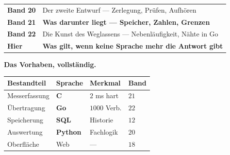 \begin{merksatz}
\begin{center}
\renewcommand{\arraystretch}{1.5}
\begin{tabular}{@{}P{2.6cm}P{6.2cm}@{}}
\toprule
\textbf{Band 20} & Der zweite Entwurf --- Zerlegung, Prüfen, Aufhören\\
\textbf{Band 21} & \textbf{Was darunter liegt --- Speicher, Zahlen, Grenzen}\\
\textbf{Band 22} & Die Kunst des Weglassens --- Nebenläufigkeit, Nähte in Go\\
\midrule
\textbf{Hier} & \textbf{Was gilt, wenn keine Sprache mehr die Antwort gibt}\\
\bottomrule
\end{tabular}
\end{center}

\begin{center}
\begin{minipage}{0.88\textwidth}
\end{minipage}
\end{center}

\textbf{Das Vorhaben, vollständig.}

\begin{center}
{\small
\renewcommand{\arraystretch}{1.45}
\begin{tabular}{@{}P{2.6cm}P{2.2cm}P{2.2cm}P{1.8cm}@{}}
\toprule
\textbf{Bestandteil} & \textbf{Sprache} & \textbf{Merkmal} & \textbf{Band}\\
\midrule
Messerfassung & \textbf{C} & $2$ ms hart & $21$\\
Übertragung & \textbf{Go} & $1000$ Verb. & $22$\\
Speicherung & \textbf{SQL} & Historie & $12$\\
Auswertung & \textbf{Python} & Fachlogik & $20$\\
Oberfläche & Web & --- & $18$\\
\bottomrule
\end{tabular}}
\end{center}

\begin{center}
\end{center}
\end{merksatz}

